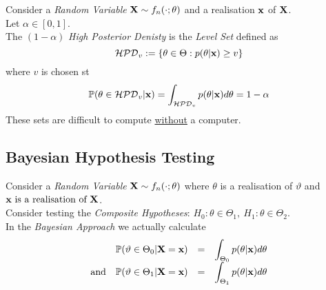 \documentclass[11pt,a4paper]{article}
\begin{document}
Consider a \textit{Random Variable} $\textbf{X}\sim f_n(\cdot;\theta)$ and a realisation $\textbf{x}$ of $\textbf{X}$.\\
Let $\alpha\in[0,1]$.\\
The $(1-\alpha)$ \textit{High Posterior Denisty} is the \textit{Level Set} defined as
$$\mathcal{HPD}_v:=\{\theta\in\Theta:p(\theta|\textbf{x})\geq v\}$$
where $v$ is chosen st
$$\mathbb{P}(\theta\in\mathcal{HPD}_v|\textbf{x})=\int_{\mathcal{HPD}_v}p(\theta|\textbf{x})d\theta=1-\alpha$$
\nb These sets are difficult to compute \underline{without} a computer.\\


\subsection{Bayesian Hypothesis Testing}

Consider a \textit{Random Variable} $\textbf{X}\sim f_n(\cdot;\theta)$ where $\theta$ is a realisation of $\vartheta$ and ${\textbf{x}\text{ is a realisation of }\textbf{X}}$.\\
Consider testing the \textit{Composite Hypotheses}: $H_0:\theta\in\Theta_1,\ H_1:\theta\in\Theta_2$.\\
In the \textit{Bayesian Approach} we actually calculate
\[\begin{array}{rrcl}
&\mathbb{P}(\vartheta\in\Theta_0|\textbf{X}=\textbf{x})&=&\displaystyle\int_{\Theta_0}p(\theta|\textbf{x})d\theta\\
\text{and}&\mathbb{P}(\vartheta\in\Theta_1|\textbf{X}=\textbf{x})&=&\displaystyle\int_{\Theta_1}p(\theta|\textbf{x})d\theta
\end{array}\]
\end{document}
